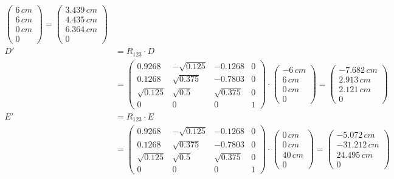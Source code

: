\begin{align*}
\begin{pmatrix}
6\,cm \\
6\,cm \\
0\,cm \\
0
\end{pmatrix}
=
\begin{pmatrix}
3.439\,cm \\
4.435\,cm \\
6.364\,cm \\
0
\end{pmatrix}\\
D' &= R_{123} \cdot D \\
&= 
\begin{pmatrix}
0.9268 & -\sqrt{0.125} & -0.1268 & 0 \\
0.1268 & \sqrt{0.375} &  -0.7803 & 0 \\
\sqrt{0.125} & \sqrt{0.5} & \sqrt{0.375}  & 0 \\
0 & 0 & 0 & 1  
\end{pmatrix}
\cdot 
\begin{pmatrix}
- 6\,cm \\
6\,cm \\
0\,cm \\
0
\end{pmatrix}
=
\begin{pmatrix}
-7.682\,cm \\
2.913\,cm \\
2.121\,cm \\
0
\end{pmatrix}\\
E' &= R_{123} \cdot E \\
&= 
\begin{pmatrix}
0.9268 & -\sqrt{0.125} & -0.1268 & 0 \\
0.1268 & \sqrt{0.375} &  -0.7803 & 0 \\
\sqrt{0.125} & \sqrt{0.5} & \sqrt{0.375}  & 0 \\
0 & 0 & 0 & 1  
\end{pmatrix}
\cdot 
\begin{pmatrix}
	0\,cm \\
	0\,cm \\
	40\,cm \\
0
\end{pmatrix}
=
\begin{pmatrix}
- 5.072\,cm \\
- 31.212\,cm \\
24.495\,cm \\
0
\end{pmatrix}\\
\end{align*}

